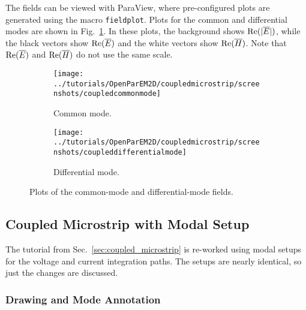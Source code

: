 \documentclass[titlepage]{article}
\renewcommand\_{\textunderscore\linebreak[1]}
\begin{document}
The fields can be viewed with ParaView, where pre-configured plots are generated using the macro \texttt{field\_plot}.  Plots for the common and differential modes are shown in Fig.~\ref{fig:coupled_fields}.  In these plots, the background shows $\textnormal{Re}(|\overline{E}|)$, while the black vectors show $\textnormal{Re}(\overline{E})$ and the white vectors show $\textnormal{Re}(\overline{H})$. Note that $\textnormal{Re}(\overline{E})$ and $\textnormal{Re}(\overline{H})$ do not use the same scale.

\begin{figure}[H]
  \centering
  \begin{subfigure}{0.75\textwidth}
     \texttt{[image: ../tutorials/OpenParEM2D/coupled\_microstrip/screenshots/coupled\_common\_mode]}
     \caption{Common mode.}
  \end{subfigure}
  \par\bigskip
  \begin{subfigure}{0.75\textwidth}
     \texttt{[image: ../tutorials/OpenParEM2D/coupled\_microstrip/screenshots/coupled\_differential\_mode]}
     \caption{Differential mode.}
  \end{subfigure}
  \caption{Plots of the common-mode and differential-mode fields.}
  \label{fig:coupled_fields}
\end{figure}

\subsection{Coupled Microstrip with Modal Setup}

The tutorial from Sec.~\ref{sec:coupled_microstrip} is re-worked using modal setups for the voltage and current integration paths.  The setups are nearly identical, so just the changes are discussed.

\subsubsection{Drawing and Mode Annotation}
\end{document}

